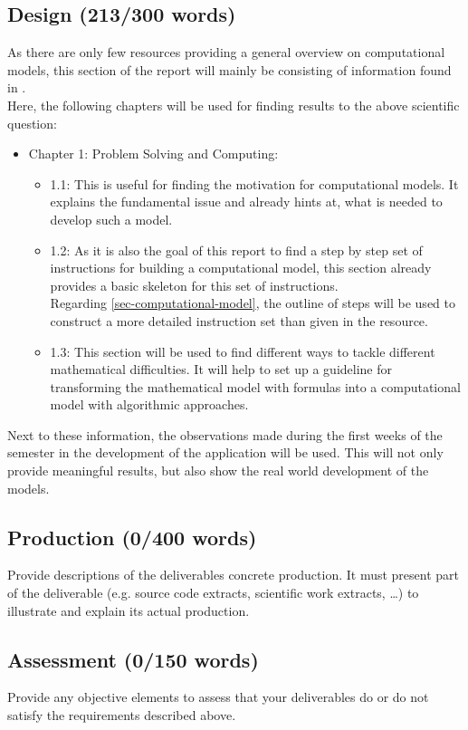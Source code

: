 \documentclass[conference,compsoc]{IEEEtran}
\begin{document}
\subsection{Design (213/300 words)}
As there are only few resources providing a general overview on computational models, this section of the report will mainly be consisting of information found in \cite{ComputationalModelsIntroduction}.\\
Here, the following chapters will be used for finding results to the above scientific question:
\begin{itemize}
	\item Chapter 1: Problem Solving and Computing:
	\begin{itemize}
		\item 1.1: This is useful for finding the motivation for computational models. It explains the fundamental issue and already hints at, what is needed to develop such a model.
		\item 1.2: As it is also the goal of this report to find a step by step set of instructions for building a computational model, this section already provides a basic skeleton for this set of instructions. \\
		Regarding \ref{sec-computational-model}, the outline of steps will be used to construct a more detailed instruction set than given in the resource. 
		\item 1.3: This section will be used to find different ways to tackle different mathematical difficulties. It will help to set up a guideline for transforming the mathematical model with formulas into a computational model with algorithmic approaches. 
	\end{itemize}
	
\end{itemize}
Next to these information, the observations made during the first weeks of the semester in the development of the application will be used. This will not only provide meaningful results, but also show the real world development of the models.
\subsection{Production (0/400 words)}
Provide descriptions of the deliverables concrete production. It must present part of the deliverable (e.g. source code extracts, scientific work extracts, \ldots) to illustrate and explain its actual production.
\subsection{Assessment (0/150 words)}
Provide any objective elements to assess that your deliverables do or do not satisfy the requirements described above. 
\end{document}
